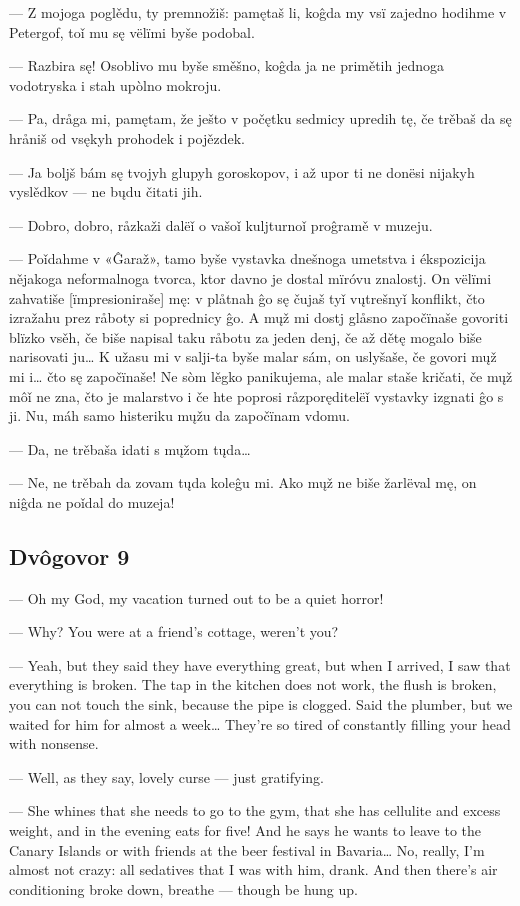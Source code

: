 — Z mojoga poglědu, ty premnožiš: pamętaš li, koĝda my vsï zajedno hodihme v Petergof, toǐ mu sę vëlïmi byše podobal.

— Razbira sę! Osoblivo mu byše směšno, koĝda ja ne primětih jednoga vodotryska i stah upòlno mokroju.

— Pa, dråga mi, pamętam, že ješto v počętku sedmicy upredih tę, če trěbaš da sę hråniš od vsękyh prohodek i pojězdek.

— Ja boljš bám sę tvojyh glupyh goroskopov, i až upor ti ne donësi nijakyh vyslědkov — ne bųdu čitati jih.

— Dobro, dobro, råzkaži dalëǐ o vašoǐ kuljturnoǐ proĝramě v muzeju.

— Poǐdahme v «Ĝaraž», tamo byše vystavka dnešnoga umetstva i ékspozicija nějakoga neformalnoga tvorca, ktor davno je dostal mïróvu znalostj. On vëlïmi zahvatiše [ïmpresioniraše] mę: v plåtnah ĝo sę čujaš tyǐ vųtrešnyǐ konflikt, čto izražahu prez råboty si poprednicy ĝo. A mųž mi dostj glåsno započïnaše govoriti blïzko vsěh, če biše napisal taku råbotu za jeden denj, če až dětę mogalo biše narisovati ju… K užasu mi v salji-ta byše malar sám, on uslyšaše, če govori mųž mi i… čto sę započïnaše! Ne sòm lěgko panikujema, ale malar staše kričati, če mųž môǐ ne zna, čto je malarstvo i če hte poprosi råzporęditelëǐ vystavky izgnati ĝo s ji. Nu, máh samo histeriku mųžu da započïnam vdomu.

— Da, ne trěbaša idati s mųžom tųda…

— Ne, ne trěbah da zovam tųda koleĝu mi. Ako mųž ne biše žarlëval mę, on niĝda ne poǐdal do muzeja!


\subsection{Dvôgovor 9}


— Oh my God, my vacation turned out to be a quiet horror!

— Why? You were at a friend’s cottage, weren’t you?

— Yeah, but they said they have everything great, but when I arrived, I saw that everything is broken. The tap in the kitchen does not work, the flush is broken, you can not touch the sink, because the pipe is clogged. Said the plumber, but we waited for him for almost a week… They’re so tired of constantly filling your head with nonsense.

— Well, as they say, lovely curse — just gratifying.

— She whines that she needs to go to the gym, that she has cellulite and excess weight, and in the evening eats for five! And he says he wants to leave to the Canary Islands or with friends at the beer festival in Bavaria… No, really, I’m almost not crazy: all sedatives that I was with him, drank. And then there’s air conditioning broke down, breathe — though be hung up.


